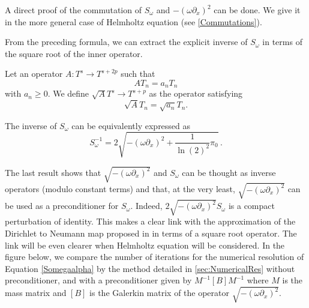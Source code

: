\documentclass[a4paper]{article}
\begin{document}
	\begin{Rem} A direct proof of the commutation of $S_\omega$ and $-(\omega\partial_x)^2$ can be done. We give it in the 
		more general case of Helmholtz equation (see \autoref{Commutations}).
	\end{Rem}	
	From the preceding formula, we can extract the explicit inverse of $S_\omega$ in terms of the square root of the inner operator.
	\begin{Def}
		Let an operator $A : T^s \to T^{s + 2p}$ such that 
		\[AT_n = a_n T_n\]
		with $a_n \geq 0$. We define $\sqrt{A} T^s \to T^{s + p}$ as the operator satisfying 
		\[\sqrt{A}T_n = \sqrt{a_n} T_n.\]
	\end{Def}
	
	\begin{Cor}
		The inverse of $S_\omega$ can be equivalently expressed as 
		\begin{equation}
		S_{\omega}^{-1} = 2\sqrt{-(\omega \partial_x)^2 + \frac{1}{\ln(2)^2}\pi_0}\,.
		\end{equation}
	\end{Cor}
	
	The last result shows that $\sqrt{-(\omega \partial_x)^2}$ and $S_\omega$ can be thought as inverse operators (modulo constant terms) and that, at the very least, $\sqrt{-(\omega \partial_x)^2}$ can be used as a preconditioner for $S_\omega$. Indeed, $2\sqrt{-(\omega \partial_x)^2}S_\omega$ is a compact perturbation of identity. This makes a clear link with the approximation of the Dirichlet to Neumann map proposed in \cite{antoine2007generalized} in terms of a square root operator. The link will be even clearer when Helmholtz equation will be considered. In the figure below, we compare the number of iterations for the numerical resolution of Equation \eqref{Somegaalpha} by the method detailed in \autoref{sec:NumericalRes} without preconditioner, and with a preconditioner given by $M^{-1} \left[B \right] M^{-1}$ where $M$ is the mass matrix and $\left[ B \right]$ is the Galerkin matrix of the operator $\sqrt{ -(\omega \partial_x)^2}$. 
	
\end{document}
